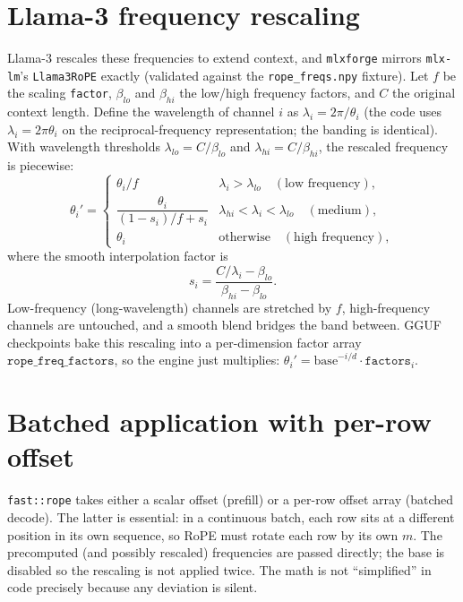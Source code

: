 \documentclass[11pt,a4paper]{report}
\newcommand{\code}[1]{\texttt{#1}}
\begin{document}
\section{Llama-3 frequency rescaling}
Llama-3 rescales these frequencies to extend context, and \code{mlxforge} mirrors
\code{mlx-lm}'s \code{Llama3RoPE} exactly (validated against the
\code{rope\_freqs.npy} fixture). Let $f$ be the scaling \code{factor}, $\beta_{lo}$
and $\beta_{hi}$ the low/high frequency factors, and $C$ the original context
length. Define the wavelength of channel $i$ as $\lambda_i = 2\pi/\theta_i$ (the
code uses $\lambda_i = 2\pi\theta_i$ on the reciprocal-frequency representation; the
banding is identical). With wavelength thresholds
$\lambda_{lo} = C/\beta_{lo}$ and $\lambda_{hi} = C/\beta_{hi}$, the rescaled
frequency is piecewise:
\begin{equation}
  \theta_i' =
  \begin{cases}
    \theta_i / f & \lambda_i > \lambda_{lo} \quad (\text{low frequency}),\\[4pt]
    \dfrac{\theta_i}{(1-s_i)/f + s_i} & \lambda_{hi} < \lambda_i < \lambda_{lo} \quad (\text{medium}),\\[10pt]
    \theta_i & \text{otherwise} \quad (\text{high frequency}),
  \end{cases}
\end{equation}
where the smooth interpolation factor is
\begin{equation}
  s_i = \frac{C/\lambda_i - \beta_{lo}}{\beta_{hi} - \beta_{lo}}.
\end{equation}
Low-frequency (long-wavelength) channels are stretched by $f$, high-frequency
channels are untouched, and a smooth blend bridges the band between. GGUF
checkpoints bake this rescaling into a per-dimension factor array
$\texttt{rope\_freq\_factors}$, so the engine just multiplies:
$\theta_i' = \text{base}^{-i/d}\cdot \texttt{factors}_i$.

\section{Batched application with per-row offset}
\code{fast::rope} takes either a scalar offset (prefill) or a per-row offset array
(batched decode). The latter is essential: in a continuous batch, each row sits at a
different position in its own sequence, so RoPE must rotate each row by its own
$m$. The precomputed (and possibly rescaled) frequencies are passed directly; the
base is disabled so the rescaling is not applied twice. The math is not
``simplified'' in code precisely because any deviation is silent.
\end{document}
